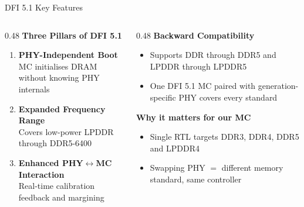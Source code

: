 \documentclass[aspectratio=169,10pt]{beamer}
\begin{document}
\begin{frame}[fragile]{DFI 5.1 Key Features}
\begin{columns}[T]

\begin{column}{0.48\textwidth}
  \vspace{4pt}
  {\small\textbf{\color{ddrblue}Three Pillars of DFI 5.1}}
  \begin{enumerate}\setlength\itemsep{7pt}\small
    \item \textbf{PHY-Independent Boot}\\
          MC initialises DRAM without knowing PHY internals
    \item \textbf{Expanded Frequency Range}\\
          Covers low-power LPDDR through DDR5-6400
    \item \textbf{Enhanced PHY$\leftrightarrow$MC Interaction}\\
          Real-time calibration feedback and margining
  \end{enumerate}
\end{column}

\begin{column}{0.48\textwidth}
  \vspace{4pt}
  {\small\textbf{\color{ddrgreen}Backward Compatibility}}
  \begin{itemize}\setlength\itemsep{6pt}\small
    \item Supports DDR through DDR5 and LPDDR through LPDDR5
    \item One DFI 5.1 MC paired with generation-specific PHY covers every standard
  \end{itemize}
  \vspace{8pt}
  {\small\textbf{\color{ddrred}Why it matters for our MC}}
  \begin{itemize}\setlength\itemsep{6pt}\small
    \item Single RTL targets DDR3, DDR4, DDR5 and LPDDR4
    \item Swapping PHY $=$ different memory standard, same controller
  \end{itemize}
\end{column}
\end{columns}
\end{frame}
\end{document}
